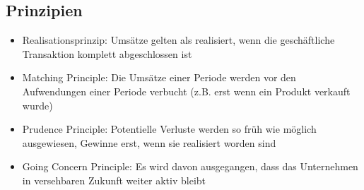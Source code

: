 \subsection{Prinzipien}
\begin{itemize}
	\item Realisationsprinzip: Umsätze gelten als realisiert, wenn die geschäftliche Transaktion komplett abgeschlossen ist
	\item Matching Principle: Die Umsätze einer Periode werden vor den Aufwendungen einer Periode verbucht (z.B. erst wenn ein Produkt verkauft wurde)
	\item Prudence Principle: Potentielle Verluste werden so früh wie möglich ausgewiesen, Gewinne erst, wenn sie realisiert worden sind
	\item Going Concern Principle: Es wird davon ausgegangen, dass das Unternehmen in versehbaren Zukunft weiter aktiv bleibt
\end{itemize}


